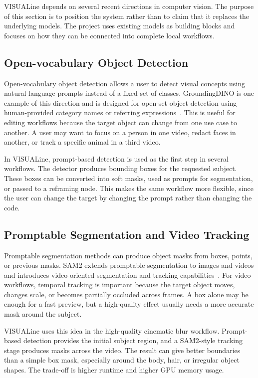 \documentclass[11pt,a4paper]{article}
\begin{document}
VISUALine depends on several recent directions in computer vision. The purpose of this section is to position the system rather than to claim that it replaces the underlying models. The project uses existing models as building blocks and focuses on how they can be connected into complete local workflows.

\subsection{Open-vocabulary Object Detection}

Open-vocabulary object detection allows a user to detect visual concepts using natural language prompts instead of a fixed set of classes. GroundingDINO is one example of this direction and is designed for open-set object detection using human-provided category names or referring expressions~\cite{liu2023groundingdino}. This is useful for editing workflows because the target object can change from one use case to another. A user may want to focus on a person in one video, redact faces in another, or track a specific animal in a third video.

In VISUALine, prompt-based detection is used as the first step in several workflows. The detector produces bounding boxes for the requested subject. These boxes can be converted into soft masks, used as prompts for segmentation, or passed to a reframing node. This makes the same workflow more flexible, since the user can change the target by changing the prompt rather than changing the code.

\subsection{Promptable Segmentation and Video Tracking}

Promptable segmentation methods can produce object masks from boxes, points, or previous masks. SAM2 extends promptable segmentation to images and videos and introduces video-oriented segmentation and tracking capabilities~\cite{ravi2024sam2}. For video workflows, temporal tracking is important because the target object moves, changes scale, or becomes partially occluded across frames. A box alone may be enough for a fast preview, but a high-quality effect usually needs a more accurate mask around the subject.

VISUALine uses this idea in the high-quality cinematic blur workflow. Prompt-based detection provides the initial subject region, and a SAM2-style tracking stage produces masks across the video. The result can give better boundaries than a simple box mask, especially around the body, hair, or irregular object shapes. The trade-off is higher runtime and higher GPU memory usage.
\end{document}
